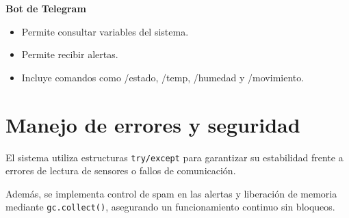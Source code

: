 \documentclass[12pt]{article}
\begin{document}
\textbf{Bot de Telegram}
\begin{itemize}
    \item Permite consultar variables del sistema.
    \item Permite recibir alertas.
    \item Incluye comandos como /estado, /temp, /humedad y /movimiento.
\end{itemize}

\section{Manejo de errores y seguridad}
El sistema utiliza estructuras \texttt{try/except} para garantizar su estabilidad frente a errores de lectura de sensores o fallos de comunicación.

Además, se implementa control de spam en las alertas y liberación de memoria mediante \texttt{gc.collect()}, asegurando un funcionamiento continuo sin bloqueos.
\end{document}
